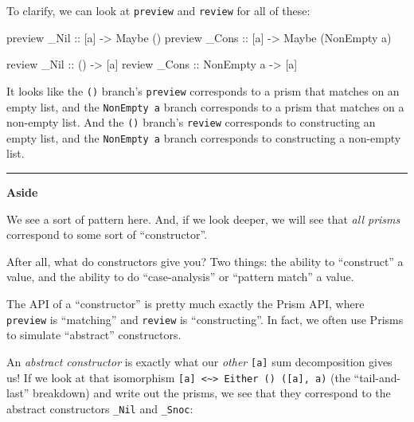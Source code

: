 \documentclass[]{article}
\newenvironment{Shaded}{}{}
\newcommand{\DataTypeTok}[1]{\textcolor[rgb]{0.56,0.13,0.00}{#1}}
\newcommand{\NormalTok}[1]{#1}
\newcommand{\OtherTok}[1]{\textcolor[rgb]{0.00,0.44,0.13}{#1}}
\begin{document}
To clarify, we can look at \texttt{preview} and \texttt{review} for all of
these:

\begin{Shaded}
\begin{Highlighting}[]
\NormalTok{preview}\OtherTok{ \_Nil  ::}\NormalTok{ [a] }\OtherTok{{-}>} \DataTypeTok{Maybe}\NormalTok{ ()}
\NormalTok{preview}\OtherTok{ \_Cons ::}\NormalTok{ [a] }\OtherTok{{-}>} \DataTypeTok{Maybe}\NormalTok{ (}\DataTypeTok{NonEmpty}\NormalTok{ a)}

\NormalTok{review}\OtherTok{  \_Nil  ::}\NormalTok{ ()         }\OtherTok{{-}>}\NormalTok{ [a]}
\NormalTok{review}\OtherTok{  \_Cons ::} \DataTypeTok{NonEmpty}\NormalTok{ a }\OtherTok{{-}>}\NormalTok{ [a]}
\end{Highlighting}
\end{Shaded}

It looks like the \texttt{()} branch's \texttt{preview} corresponds to a prism
that matches on an empty list, and the \texttt{NonEmpty\ a} branch corresponds
to a prism that matches on a non-empty list. And the \texttt{()} branch's
\texttt{review} corresponds to constructing an empty list, and the
\texttt{NonEmpty\ a} branch corresponds to constructing a non-empty list.

\begin{center}\rule{0.5\linewidth}{\linethickness}\end{center}

\textbf{Aside}

We see a sort of pattern here. And, if we look deeper, we will see that
\emph{all prisms} correspond to some sort of ``constructor''.

After all, what do constructors give you? Two things: the ability to
``construct'' a value, and the ability to do ``case-analysis'' or ``pattern
match'' a value.

The API of a ``constructor'' is pretty much exactly the Prism API, where
\texttt{preview} is ``matching'' and \texttt{review} is ``constructing''. In
fact, we often use Prisms to simulate ``abstract'' constructors.

An \emph{abstract constructor} is exactly what our \emph{other} \texttt{{[}a{]}}
sum decomposition gives us! If we look at that isomorphism
\texttt{{[}a{]}\ \textless{}\textasciitilde{}\textgreater{}\ Either\ ()\ ({[}a{]},\ a)}
(the ``tail-and-last'' breakdown) and write out the prisms, we see that they
correspond to the abstract constructors \texttt{\_Nil} and \texttt{\_Snoc}:
\end{document}
